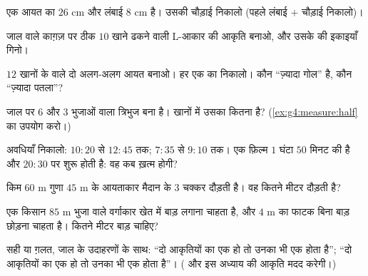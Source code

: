 \begin{exercise}[$\star$]\label{exo:g4:measure:4}
एक आयत का  $26$ cm और लंबाई $8$ cm है। उसकी चौड़ाई निकालो
(पहले लंबाई $+$ चौड़ाई निकालो)।
\end{exercise}

\begin{exercise}[$\star$]\label{exo:g4:measure:5}
जाल वाले काग़ज़ पर ठीक $10$ खाने ढकने वाली L-आकार की आकृति
बनाओ, और उसके  की इकाइयाँ गिनो।
\end{exercise}

\begin{exercise}[$\star$]\label{exo:g4:measure:6}
$12$ खानों के  वाले दो अलग-अलग आयत बनाओ। हर एक का
 निकालो। कौन ``ज़्यादा गोल'' है, कौन ``ज़्यादा पतला''?
\end{exercise}

\begin{exercise}[$\star$]\label{exo:g4:measure:7}
जाल पर $6$ और $3$ भुजाओं वाला  त्रिभुज बना है। खानों में
उसका  कितना है? (\cref{ex:g4:measure:half} का उपयोग करो।)
\end{exercise}

\begin{exercise}[$\star$]\label{exo:g4:measure:8}
अवधियाँ निकालो: $10{:}20$ से $12{:}45$ तक; $7{:}35$ से
$9{:}10$ तक। एक फ़िल्म $1$ घंटा $50$ मिनट की है और $20{:}30$ पर
शुरू होती है: वह कब ख़त्म होगी?
\end{exercise}

\begin{exercise}[$\star$]\label{exo:g4:measure:9}
किम $60$ m गुणा $45$ m के आयताकार मैदान के $3$ चक्कर दौड़ती है।
वह कितने मीटर दौड़ती है?
\end{exercise}

\begin{exercise}[$\star\star$]\label{exo:g4:measure:10}
एक किसान $85$ m भुजा वाले वर्गाकार खेत में बाड़ लगाना चाहता है,
और $4$ m का फाटक बिना बाड़ छोड़ना चाहता है। कितने मीटर बाड़ चाहिए?
\end{exercise}

\begin{exercise}[$\star\star$]\label{exo:g4:measure:11}
सही या ग़लत, जाल के उदाहरणों के साथ: ``दो आकृतियों का
 एक हो तो उनका  भी एक होता है''; ``दो आकृतियों का
 एक हो तो उनका  भी एक होता है''।
( और इस अध्याय की आकृति मदद करेगी।)
\end{exercise}
